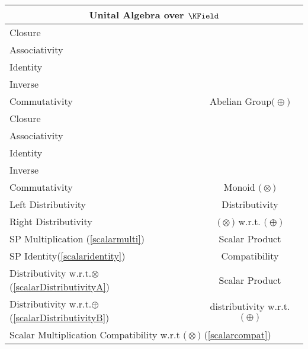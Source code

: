 \documentclass[a4paper,12pt]{scrartcl}
\newcommand{\OpA}{\otimes}
\newcommand{\OpB}{\oplus}
\begin{document}
\begin{minipage}[c]{0,5\textwidth}
\vspace{0.6cm}
\begin{tabular}{|l|c|} %
  \hline
  \multicolumn{2}{c}{\cellcolor{green!25}Unital Algebra over $\KField$} \\
  \hline
    \cellcolor{blue!25} \footnotesize Closure& \cellcolor{yellow!25}  \\
    \cellcolor{blue!25} \footnotesize Associativity& \cellcolor{yellow!25}  \\
    \cellcolor{blue!25} \footnotesize Identity& \cellcolor{yellow!25} \\
    \cellcolor{blue!25} \footnotesize Inverse& \cellcolor{yellow!25} \\
    \cellcolor{blue!25} \footnotesize Commutativity& \multirow{-5}{*}{\tiny\cellcolor{yellow!25}Abelian Group$\big(\OpB\big)$} \\
   \hline
    \cellcolor{blue!25} \footnotesize Closure& \cellcolor{yellow!25}  \\
    \cellcolor{blue!25} \footnotesize Associativity& \cellcolor{yellow!25}  \\
    \cellcolor{blue!25} \footnotesize Identity& \cellcolor{yellow!25} \\
    \cellcolor{red!25} \footnotesize Inverse& \cellcolor{yellow!25} \\
    \cellcolor{red!25} \footnotesize Commutativity& \multirow{-5}{*}{\tiny\cellcolor{yellow!25} Monoid $\big(\OpA\big)$} \\
  \hline
  	\cellcolor{blue!25} \footnotesize Left Distributivity&  \tiny\cellcolor{yellow!25}Distributivity\\
    \cellcolor{blue!25} \footnotesize Right Distributivity & \tiny\cellcolor{yellow!25} $\big(\OpA\big)$ w.r.t. $\big(\OpB\big)$  \\
   \hline
  \hline
     \cellcolor{blue!25} \footnotesize SP Multiplication (\ref{scalarmulti})&  \tiny\cellcolor{yellow!25}Scalar Product\\
    \cellcolor{blue!25} \footnotesize SP Identity(\ref{scalaridentity}) & \tiny\cellcolor{yellow!25} Compatibility  \\
   \hline 
    \cellcolor{blue!25} \footnotesize Distributivity w.r.t.$\OpA$ (\ref{scalarDistributivityA})&  \tiny\cellcolor{yellow!25}Scalar Product\\
    \cellcolor{blue!25} \footnotesize Distributivity w.r.t.$\OpB$ (\ref{scalarDistributivityB}) & \tiny\cellcolor{yellow!25} distributivity w.r.t. $\big(\OpB\big)$  \\
   \hline
    \multicolumn{2}{l}{\footnotesize \cellcolor{blue!25} Scalar Multiplication Compatibility w.r.t  $\big(\OpA\big)$ (\ref{scalarcompat})}\\
   \hline
\end{tabular}

\end{minipage}
\end{document}
